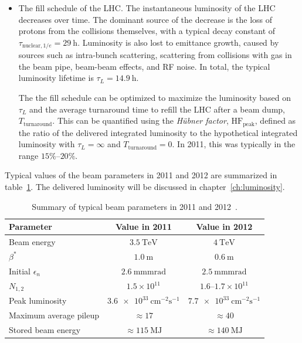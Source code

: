 \begin{itemize}
	\item The fill schedule of the LHC. The instantaneous luminosity of the LHC decreases over time. The dominant source of the decrease is the loss of protons from the collisions themselves, with a typical decay constant of $\tau_{\mathrm{nuclear},1/e}=\SI{29}{\hour}$. Luminosity is also lost to emittance growth, caused by sources such as intra-bunch scattering, scattering from collisions with gas in the beam pipe, beam-beam effects, and RF noise. In total, the typical luminosity lifetime is $\tau_L=\SI{14.9}{\hour}$. 

	The the fill schedule can be optimized to maximize the luminosity based on $\tau_L$ and the average turnaround time to refill the LHC after a beam dump, $T_{\mathrm{turnaround}}$. This can be quantified using the \emph{H{\"u}bner factor}, $\mathrm{HF}_{\mathrm{peak}}$, defined as the ratio of the delivered integrated luminosity to the hypothetical integrated luminosity with $\tau_L=\infty$ and $T_{\mathrm{turnaround}}=0$. In 2011, this was typically in the range $15\%$--$20\%$.
\end{itemize}

Typical values of the beam parameters in 2011 and 2012 are summarized in table~\ref{table:experiment-beam-parameters}. The delivered luminosity will be discussed in chapter~\ref{ch:luminosity}.

\begin{table}[htbp]
	\centering
	\begin{tabular}{lcc}
		\hline
		Parameter & Value in 2011 & Value in 2012 \\
		\hline
		Beam energy & $\SI{3.5}{\tera\electronvolt}$ & $\SI{4}{\tera\electronvolt}$ \\
		$\beta^*$ & $\SI{1.0}{\meter}$ & $\SI{0.6}{\meter}$ \\
		Initial $\epsilon_n$ & $\SI{2.6}{\milli\meter\milli\radian}$ & $\SI{2.5}{\milli\meter\milli\radian}$ \\
		$N_{1,2}$ & $1.5\times 10^{11}$ & $1.6$--$1.7\times10^{11}$ \\
		Peak luminosity & $\SI{3.6e33}{\centi\meter\tothe{-2}\second\tothe{-1}}$ & $\SI{7.7e33}{\centi\meter\tothe{-2}\second\tothe{-1}}$ \\
		Maximum average pileup & $\approx 17$ & $\approx 40$ \\
		Stored beam energy & $\approx\SI{115}{\mega\joule}$ & $\approx \SI{140}{\mega\joule}$ \\
	\end{tabular}
	\caption{Summary of typical beam parameters in 2011 and 2012~\cite{Lamont:2013ca}.}
	\label{table:experiment-beam-parameters}
\end{table}



